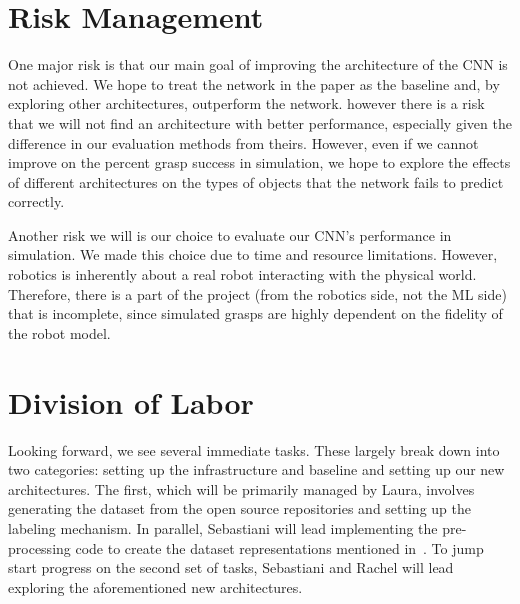 \documentclass[letterpaper, 10 pt]{article}
\begin{document}
\section{Risk Management}

One major risk is that our main goal of improving the architecture of the CNN is not achieved. We hope to treat the network in the paper as the baseline and, by exploring other architectures, outperform the network. however there is a risk that we will not find an architecture with better performance, especially given the difference in our evaluation methods from theirs. However, even if we cannot improve on the percent grasp success in simulation, we hope to explore the effects of different architectures on the types of objects that the network fails to predict correctly. 

Another risk we will is our choice to evaluate our CNN's performance in simulation. We made this choice due to time and resource limitations. However, robotics is inherently about a real robot interacting with the physical world. Therefore, there is a part of the project (from the robotics side, not the ML side) that is incomplete, since simulated grasps are highly dependent on the fidelity of the robot model.

\section{Division of Labor}

Looking forward, we see several immediate tasks. These largely break down into two categories: setting up the infrastructure and baseline and setting up our new architectures. The first, which will be primarily managed by Laura, involves generating the dataset from the open source repositories and setting up the labeling mechanism.  
In parallel, Sebastiani will lead implementing the pre-processing code to create the dataset representations mentioned in~\cite{pas2017grasp}. 
To jump start progress on the second set of tasks, Sebastiani and Rachel will lead exploring the aforementioned new architectures. 


{\footnotesize
    
}
\end{document}
